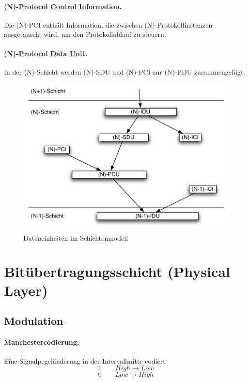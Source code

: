 \documentclass[]{scrartcl}
\begin{document}
\paragraph{(N)-\underline{P}rotocol \underline{C}ontrol \underline{I}nformation.} Die (N)-PCI enth\"alt Information, die zwischen (N)-Protokollinstanzen ausgetauscht wird, um den Protokollablauf zu steuern. 

\paragraph{(N)-\underline{P}rotocol \underline{D}ata \underline{U}nit.} In der (N)-Schicht werden (N)-SDU und (N)-PCI zur (N)-PDU zusammengef\"ugt.


\begin{figure}[H]
\begin{center}
\includegraphics[scale=0.6]{figures/Schichten.pdf}
\caption{Dateneinheiten im Schichtenmodell}
\label{default}
\end{center}
\end{figure}


\section{Bit\"ubertragungsschicht (Physical Layer)}



\subsection{Modulation}


\paragraph{Manchestercodierung. } Eine Signalpegel\"anderung in der Intervallmitte codiert
 $$1 \qquad High \rightarrow Low$$
 $$0\qquad Low \rightarrow High$$
\end{document}
